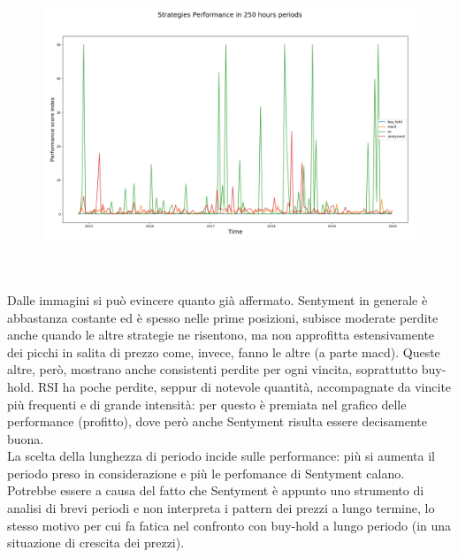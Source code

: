 \documentclass[a4paper,12pt]{report}
\begin{document}
\begin{fig}
\begin{fig}
\begin{subfigure}{\linewidth}
		\includegraphics[width=.5\linewidth]{final_perf_250}
	\end{subfigure}
	\label{Figura 27}
\end{fig}
\\~\\Dalle immagini si può evincere quanto già affermato. Sentyment in generale è abbastanza costante ed è spesso nelle prime posizioni, subisce moderate perdite anche quando le altre strategie ne risentono, ma non approfitta estensivamente dei picchi in salita di prezzo come, invece, fanno le altre (a parte macd). Queste altre, però, mostrano anche consistenti perdite per ogni vincita, soprattutto buy-hold. RSI ha poche perdite, seppur di notevole quantità, accompagnate da vincite più frequenti e di grande intensità: per questo è premiata nel grafico delle performance (profitto), dove però anche Sentyment risulta essere decisamente buona.\\ La scelta della lunghezza di periodo incide sulle performance: più si aumenta il periodo preso in considerazione e più le perfomance di Sentyment calano. Potrebbe essere a causa del fatto che Sentyment è appunto uno strumento di analisi di brevi periodi e non interpreta i pattern dei prezzi a lungo termine, lo stesso motivo per cui fa fatica nel confronto con buy-hold a lungo periodo (in una situazione di crescita dei prezzi).\\~\\
\begin{fig}
	\begin{subfigure}{\linewidth}

\end{subfigure}
\end{fig}
\end{fig}
\end{document}
